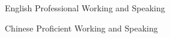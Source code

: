 

\begin{cvskills}

  \cvskill
  {English} %
  {Professional Working and Speaking} %

  \cvskill
  {Chinese} %
  {Proficient Working and Speaking} %
  
\end{cvskills}
